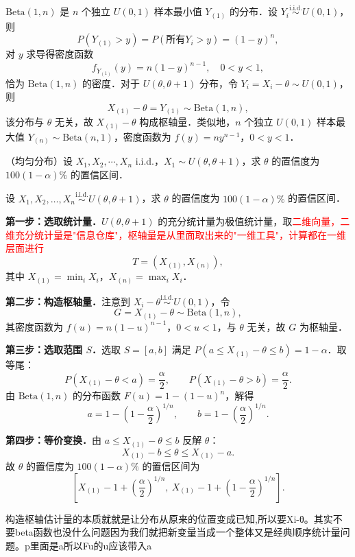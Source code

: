 \begin{note}
$\text{Beta}(1,n)$ 是 $n$ 个独立 $U(0,1)$ 样本最小值 $Y_{(1)}$ 的分布．设 $Y_i \overset{\text{i.i.d.}}{\sim} U(0,1)$，则
\[
P(Y_{(1)} > y) = P(\text{所有} Y_i > y) = (1-y)^n,
\]
对 $y$ 求导得密度函数
\[
f_{Y_{(1)}}(y) = n(1-y)^{n-1}, \quad 0 < y < 1,
\]
恰为 $\text{Beta}(1,n)$ 的密度．对于 $U(\theta, \theta+1)$ 分布，令 $Y_i = X_i - \theta \sim U(0,1)$，则
\[
X_{(1)} - \theta = Y_{(1)} \sim \text{Beta}(1,n),
\]
该分布与 $\theta$ 无关，故 $X_{(1)} - \theta$ 构成枢轴量．类似地，$n$ 个独立 $U(0,1)$ 样本最大值 $Y_{(n)} \sim \text{Beta}(n,1)$，密度函数为 $f(y) = ny^{n-1}$，$0 < y < 1$．
\end{note}
\begin{homework}[1]
（均匀分布）设 $X_1, X_2, \cdots, X_n$ i.i.d.，$X_1 \sim U(\theta, \theta+1)$，求 $\theta$ 的置信度为 $100(1-\alpha)\%$ 的置信区间．
\end{homework}
\begin{solution}
设 $X_1, X_2, \ldots, X_n \overset{\text{i.i.d.}}{\sim} U(\theta, \theta+1)$，求 $\theta$ 的置信度为 $100(1-\alpha)\%$ 的置信区间．

\textbf{第一步：选取统计量．}$U(\theta, \theta+1)$ 的充分统计量为极值统计量，取\textcolor{red}{二维向量，二维充分统计量是"信息仓库"，枢轴量是从里面取出来的"一维工具"，计算都在一维层面进行}
\[
T = (X_{(1)}, X_{(n)}),
\]
其中 $X_{(1)} = \min_i X_i$，$X_{(n)} = \max_i X_i$．

\textbf{第二步：构造枢轴量．}注意到 $X_i - \theta \overset{\text{i.i.d.}}{\sim} U(0,1)$，令
\[
G = X_{(1)} - \theta \sim \text{Beta}(1,n),
\]
其密度函数为 $f(u) = n(1-u)^{n-1}$，$0 < u < 1$，与 $\theta$ 无关，故 $G$ 为枢轴量．

\textbf{第三步：选取范围 $S$．}选取 $S = [a, b]$ 满足 $P(a \leqslant X_{(1)} - \theta \leqslant b) = 1 - \alpha$．取等尾：
\[
P(X_{(1)} - \theta < a) = \frac{\alpha}{2}, \qquad P(X_{(1)} - \theta > b) = \frac{\alpha}{2}.
\]
由 $\text{Beta}(1,n)$ 的分布函数 $F(u) = 1-(1-u)^n$，解得
\[
a = 1 - \left(1-\frac{\alpha}{2}\right)^{1/n}, \qquad b = 1 - \left(\frac{\alpha}{2}\right)^{1/n}.
\]

\textbf{第四步：等价变换．}由 $a \leqslant X_{(1)} - \theta \leqslant b$ 反解 $\theta$：
\[
X_{(1)} - b \leqslant \theta \leqslant X_{(1)} - a.
\]
故 $\theta$ 的置信度为 $100(1-\alpha)\%$ 的置信区间为
\[
\left[X_{(1)} - 1 + \left(\frac{\alpha}{2}\right)^{1/n},\ X_{(1)} - 1 + \left(1-\frac{\alpha}{2}\right)^{1/n}\right].
\]
\end{solution}
\begin{dxtips}
    构造枢轴估计量的本质就就是让分布从原来的位置变成已知,所以要Xi-θ。其实不要beta函数也没什么问题因为我们就把新变量当成一个整体又是经典顺序统计量问题。p里面是a所以Fu的u应该带入a
\end{dxtips}

